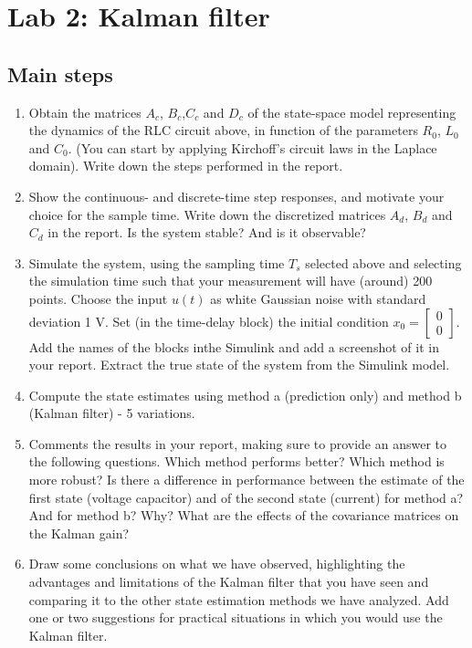 \chapter{Lab 2: Kalman filter}

\section{Main steps}

\begin{enumerate}
    \item Obtain the matrices  $A_c$, $B_c$,$C_c$ and $D_c$ of the state-space model representing the dynamics of the RLC circuit above, in function of the parameters $R_0$, $L_0$
    and $C_0$. (You can start by applying Kirchoff’s circuit laws in the Laplace domain). Write down the steps performed in the report.
    \item Show the continuous- and discrete-time step responses, and motivate your choice for the sample time. Write down the discretized matrices $A_d$, $B_d$ and $C_d$ in
    the report. Is the system stable? And is it observable?
    \item Simulate the system, using the sampling time $T_s$ selected above and selecting
    the simulation time such that your measurement will have (around) 200 points.
    Choose the input $u(t)$ as white Gaussian noise with standard deviation 1 V. Set (in
    the time-delay block) the initial condition $x_0 =
     \begin{bmatrix}
    0\\
    0
    \end{bmatrix}$.
     Add the names of the blocks inthe Simulink and add a screenshot of it in your report. Extract the true state of the system from the Simulink model.
     \item Compute the state estimates using method a (prediction only) and method b (Kalman filter) - 5 variations.
     \item Comments the results in your report, making sure to provide an answer
    to the following questions. Which method performs better? Which method is more
    robust? Is there a difference in performance between the estimate of the first state
    (voltage capacitor) and of the second state (current) for method a? And for method
    b? Why? What are the effects of the covariance matrices on the Kalman gain?
    \item Draw some conclusions on what we have observed, highlighting the advantages
    and limitations of the Kalman filter that you have seen and comparing it
    to the other state estimation methods we have analyzed. Add one or two suggestions
    for practical situations in which you would use the Kalman filter.
\end{enumerate}

